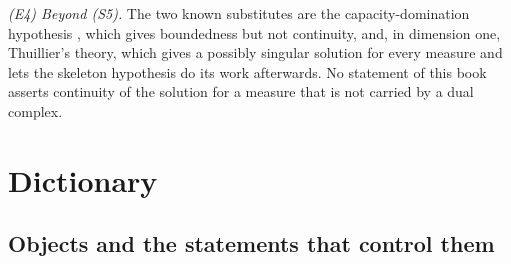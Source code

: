 \emph{(E4) Beyond \textup{(S5)}.}  The two known substitutes are the
capacity-domination hypothesis
, which gives boundedness but not
continuity, and, in dimension one, Thuillier's theory, which gives a
possibly singular solution for every measure and lets the skeleton
hypothesis do its work afterwards.  No statement of this book asserts
continuity of the solution for a measure that is not carried by a dual
complex.

\section{Dictionary}
\label{sec:ch29-dictionary}

\subsection{Objects and the statements that control them}
\label{sec:ch29-dict-objects}

